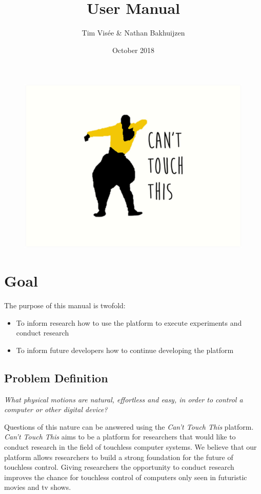 \documentclass[a4paper]{article}
\title{User Manual}
\author{Tim Visée \& Nathan Bakhuijzen}
\date{October 2018}
\providecommand{\tightlist}{%
\setlength{\itemsep}{0pt}\setlength{\parskip}{0pt}}
\begin{document}
  \maketitle
  \begin{figure}[h]
    \centering
    \includegraphics[width=\linewidth]{cant-touch-this}
  \end{figure}
  \clearpage

  \section{Goal}
  The purpose of this manual is twofold:
  \begin{itemize}
    \tightlist
    \item To inform research how to use the platform to execute experiments and
      conduct research
    \item To inform future developers how to continue developing the platform
  \end{itemize}

  \subsection{Problem Definition}
  \textit{What physical motions are natural, effortless and easy, in order to
    control a computer or other digital device?}

  Questions of this nature can be answered using the \textit{Can't Touch This}
  platform. \textit{Can't Touch This} aims to be a platform for researchers that
  would like to conduct research in the field of touchless computer systems. We
  believe that our platform allows researchers to build a strong foundation for
  the future of touchless control. Giving researchers the opportunity to conduct
  research improves the chance for touchless control of computers only seen in
  futuristic movies and tv shows.
\end{document}
